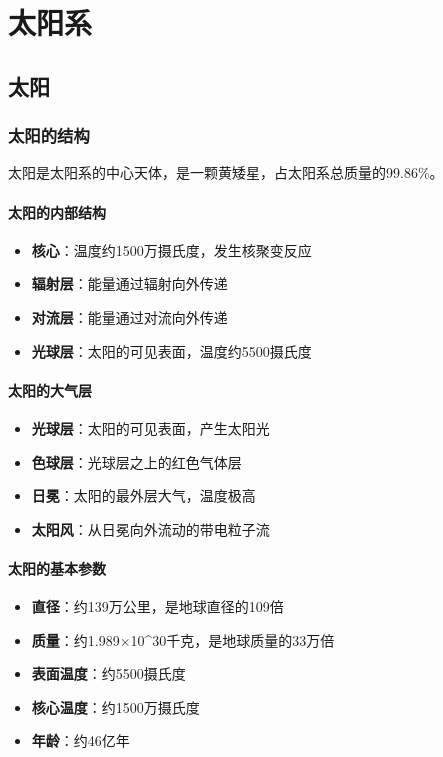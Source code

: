 \documentclass[12pt,UTF8]{ctexbook}
\begin{document}
\part{太阳系}

\chapter{太阳}
\section{太阳的结构}

太阳是太阳系的中心天体，是一颗黄矮星，占太阳系总质量的99.86\%。

\subsection{太阳的内部结构}

\begin{itemize}
  \item \textbf{核心}：温度约1500万摄氏度，发生核聚变反应
  \item \textbf{辐射层}：能量通过辐射向外传递
  \item \textbf{对流层}：能量通过对流向外传递
  \item \textbf{光球层}：太阳的可见表面，温度约5500摄氏度
\end{itemize}

\subsection{太阳的大气层}

\begin{itemize}
  \item \textbf{光球层}：太阳的可见表面，产生太阳光
  \item \textbf{色球层}：光球层之上的红色气体层
  \item \textbf{日冕}：太阳的最外层大气，温度极高
  \item \textbf{太阳风}：从日冕向外流动的带电粒子流
\end{itemize}

\subsection{太阳的基本参数}

\begin{itemize}
  \item \textbf{直径}：约139万公里，是地球直径的109倍
  \item \textbf{质量}：约1.989×10^30千克，是地球质量的33万倍
  \item \textbf{表面温度}：约5500摄氏度
  \item \textbf{核心温度}：约1500万摄氏度
  \item \textbf{年龄}：约46亿年
\end{itemize}
\end{document}
